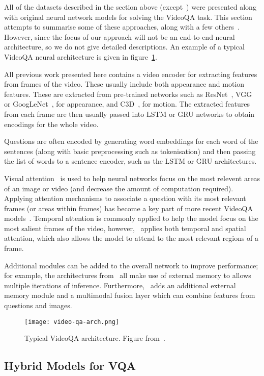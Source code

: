 \documentclass[../interim.tex]{subfiles}
\begin{document}
All of the datasets described in the section above (except~\cite{dataset:ego-vqa}) were presented along with original neural network models for solving the VideoQA task. This section attempts to summarise some of these approaches, along with a few others~\cite{videoqa:co-mem, videoqa:cwd, videoqa:mm-att, videoqa:strr}. However, since the focus of our approach will not be an end-to-end neural architecture, so we do not give detailed descriptions. An example of a typical VideoQA neural architecture is given in figure~\ref{fig:video-qa-arch}.

All previous work presented here contains a video encoder for extracting features from frames of the video. These usually include both appearance and motion features. These are extracted from pre-trained networks such as ResNet~\cite{resnet}, VGG~\cite{vgg} or GoogLeNet~\cite{googlenet}, for appearance, and C3D~\cite{c3d}, for motion. The extracted features from each frame are then usually passed into LSTM or GRU networks to obtain encodings for the whole video.

Questions are often encoded by generating word embeddings for each word of the sentences (along with basic preprocessing such as tokenisation) and then passing the list of words to a sentence encoder, such as the LSTM or GRU architectures.

Visual attention~\cite{visual-attention} is used to help neural networks focus on the most relevent areas of an image or video (and decrease the amount of computation required). Applying attention mechanisms to associate a question with its most relevant frames (or areas within frames) has become a key part of more recent VideoQA models~\cite{dataset:tgif-qa, dataset:xu, dataset:youtube2text-qa, dataset:tvqa, videoqa:co-mem, videoqa:cwd, videoqa:mm-att, dataset:pororo-qa}. Temporal attention is commonly applied to help the model focus on the most salient frames of the video, however,~\cite{dataset:tgif-qa} applies both temporal and spatial attention, which also allows the model to attend to the most relevant regions of a frame.

Additional modules can be added to the overall network to improve performance; for example, the architectures from~\cite{videoqa:mm-att, dataset:zeng, videoqa:co-mem} all make use of external memory to allows multiple iterations of inference. Furthermore,~\cite{videoqa:mm-att} adds an additional external memory module and a multimodal fusion layer which can combine features from questions and images.

\begin{figure}
  \centering
  \texttt{[image: video-qa-arch.png]}
  \caption{Typical VideoQA architecture. Figure from~\cite{dataset:ego-vqa}.}
  \label{fig:video-qa-arch}
\end{figure}


\subsection{Hybrid Models for VQA}
\end{document}
